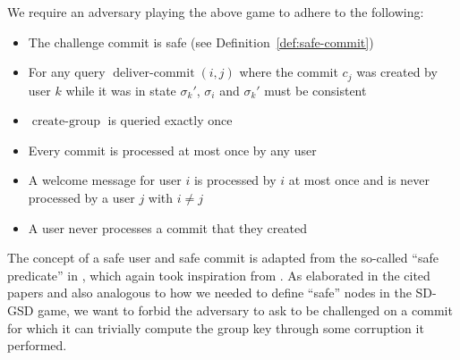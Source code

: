 \begin{definition}
	We require an adversary playing the above game to adhere to the following:
	\begin{itemize}
		\item The challenge commit is safe (see Definition~\vref{def:safe-commit}) 
		\item For any query $\operatorname{deliver-commit}(i, j)$ where the commit $c_j$ was created by user $k$ while it was in state $\sigma_k'$, $\sigma_i$ and $\sigma_k'$ must be consistent
		\item $\operatorname{create-group}$ is queried exactly once 
		\item Every commit is processed at most once by any user
		\item A welcome message for user $i$ is processed by $i$ at most once and is never processed by a user $j$ with $i \neq j$
		\item A user never processes a commit that they created
	\end{itemize}

\end{definition}

The concept of a safe user and safe commit is adapted from the so-called ``safe predicate'' in \cite{ttkem}, which again took inspiration from \cite{rtreekem}. As elaborated in the cited papers and also analogous to how we needed to define ``safe'' nodes in the SD-GSD game, we want to forbid the adversary to ask to be challenged on a commit for which it can trivially compute the group key through some corruption it performed.

